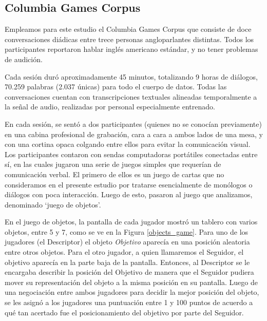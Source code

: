 \subsection{Columbia Games Corpus}

\newcommand{\objectgame} {\emph{Juego de objetos}}


Empleamos para este estudio el Columbia Games Corpus \cite{GRAV2009} que consiste de doce conversaciones diádicas entre trece personas angloparlantes distintas. Todos los participantes reportaron hablar inglés americano estándar, y no tener problemas de audición. 

Cada sesión duró aproximadamente 45 minutos, totalizando 9 horas de
diálogos, 70.259 palabras (2.037 únicas) para todo el cuerpo de datos. Todas las conversaciones cuentan con transcripciones textuales alineadas temporalmente a la señal de audio, realizadas por personal especialmente entrenado.

En cada sesión, se sentó a dos participantes (quienes no se conocían previamente) en una cabina profesional de grabación, cara a cara a ambos lados de una mesa, y con una cortina opaca colgando entre ellos para evitar la comunicación visual. Los participantes contaron con sendas computadoras portátiles conectadas entre sí, en las cuales jugaron una serie de juegos simples que requerían de comunicación verbal. El primero de ellos es un juego de cartas que no consideramos en el presente estudio por tratarse esencialmente de monólogos o diálogos con poca interacción. Luego de esto, pasaron al juego que analizamos, denominado `juego de objetos'.

En el juego de objetos, la pantalla de cada jugador mostró un tablero con varios objetos, entre 5 y 7, como se ve en la Figura \ref{objects_game}.
Para uno de los jugadores (el Descriptor) el objeto \emph{Objetivo} aparecía en una posición aleatoria entre otros objetos. Para el otro jugador, a quien llamaremos el Seguidor, el objetivo aparecía en la parte baja de la pantalla. Entonces, al Descriptor se le encargaba describir la posición del Objetivo de manera que el Seguidor pudiera mover su representación del objeto a la misma posición en su pantalla. Luego de una negociación entre ambos jugadores para decidir la mejor posición del objeto, se les asignó a los jugadores una puntuación entre 1 y 100 puntos de acuerdo a qué tan acertado fue el posicionamiento del objetivo por parte del Seguidor.

